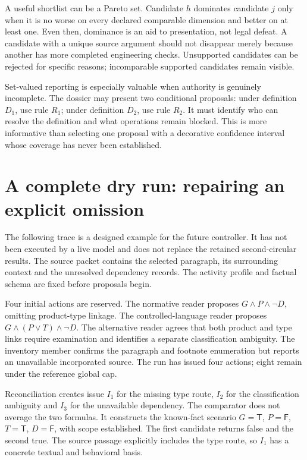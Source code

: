 \documentclass[12pt,a4paper,oneside,openany]{book}
\newcommand{\True}{\mathsf{T}}
\newcommand{\False}{\mathsf{F}}
\begin{document}
A useful shortlist can be a Pareto set. Candidate $h$ dominates candidate $j$ only
when it is no worse on every declared comparable dimension and better on at least
one. Even then, dominance is an aid to presentation, not legal defeat. A candidate
with a unique source argument should not disappear merely because another has
more completed engineering checks. Unsupported candidates can be rejected for
specific reasons; incomparable supported candidates remain visible.

Set-valued reporting is especially valuable when authority is genuinely
incomplete. The dossier may present two conditional proposals: under definition
$D_1$, use rule $R_1$; under definition $D_2$, use rule $R_2$. It must identify who
can resolve the definition and what operations remain blocked. This is more
informative than selecting one proposal with a decorative confidence interval
whose coverage has never been established.

\section{A complete dry run: repairing an explicit omission}
\label{merge:M06:20}


The following trace is a designed example for the future controller. It has not
been executed by a live model and does not replace the retained second-circular
results. The source packet contains the selected paragraph, its surrounding
context and the unresolved dependency records. The activity profile and factual
schema are fixed before proposals begin.

Four initial actions are reserved. The normative reader proposes
$G\land P\land\neg D$, omitting product-type linkage. The controlled-language
reader proposes $G\land(P\lor T)\land\neg D$. The alternative reader agrees that
both product and type links require examination and identifies a separate
classification ambiguity. The inventory member confirms the paragraph and
footnote enumeration but reports an unavailable incorporated source. The run has
issued four actions; eight remain under the reference global cap.

Reconciliation creates issue $I_1$ for the missing type route, $I_2$ for the
classification ambiguity and $I_3$ for the unavailable dependency. The comparator
does not average the two formulas. It constructs the known-fact scenario
$G=\True$, $P=\False$, $T=\True$, $D=\False$, with scope established. The first
candidate returns false and the second true. The source passage explicitly
includes the type route, so $I_1$ has a concrete textual and behavioral basis.
\end{document}
